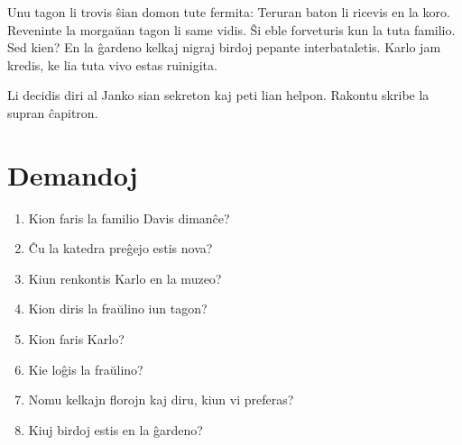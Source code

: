Unu tagon li trovis ŝian domon tute fermita: Teruran baton li ricevis en la koro. Reveninte la morgaŭan tagon li same vidis. Ŝi eble forveturis kun la tuta familio. Sed kien? En la ĝardeno kelkaj nigraj birdoj pepante interbataletis. Karlo jam kredis, ke lia tuta vivo estas ruinigita.

Li decidis diri al Janko sian sekreton kaj peti lian helpon.
Rakontu skribe la supran ĉapitron.

\newpage

\section*{Demandoj}

\begin{enumerate}
    \item  Kion faris la familio Davis dimanĉe?
    \item  Ĉu la katedra preĝejo estis nova?
    \item  Kiun renkontis Karlo en la muzeo?
    \item  Kion diris la fraŭlino iun tagon?
    \item  Kion faris Karlo?
    \item  Kie loĝis la fraŭlino?
    \item  Nomu kelkajn florojn kaj diru, kiun vi preferas?
    \item  Kiuj birdoj estis en la ĝardeno?
\end{enumerate}
